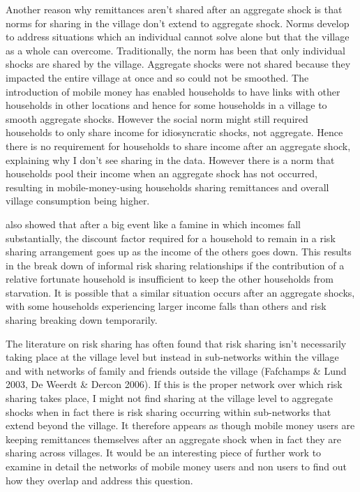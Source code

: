 Another reason why remittances aren't shared after an aggregate shock is that norms for sharing in the village don't extend to aggregate shock. Norms develop to address situations which an individual cannot solve alone but that the village as a whole can overcome. Traditionally, the norm has been that only individual shocks are shared by the village. Aggregate shocks were not shared because they impacted the entire village at once and so could not be smoothed. The introduction of mobile money has enabled households to have links with other households in other locations and hence for some households in a village to smooth aggregate shocks. However the social norm might still required households to only share income for idiosyncratic shocks, not aggregate. Hence there is no requirement for households to share income after an aggregate shock, explaining why I don't see sharing in the data. However there is a norm that households pool their income when an aggregate shock has not occurred, resulting in mobile-money-using households sharing remittances and overall village consumption being higher.

\cite{coate1993} also showed that after a big event like a famine in which incomes fall substantially, the discount factor required for a household to remain in a risk sharing arrangement goes up as the income of the others goes down. This results in the break down of informal risk sharing relationships if the contribution of a relative fortunate household is insufficient to keep the other households from starvation. It is possible that a similar situation occurs after an aggregate shocks, with some households experiencing larger income falls than others and risk sharing breaking down temporarily.  

The literature on risk sharing has often found that risk sharing isn't necessarily taking place at the village level but instead in sub-networks within the village and with networks of family and friends outside the village (Fafchamps \& Lund 2003, De Weerdt \& Dercon 2006). If this is the proper network over which risk sharing takes place, I might not find sharing at the village level to aggregate shocks when in fact there is risk sharing occurring within sub-networks that extend beyond the village. It therefore appears as though mobile money users are keeping remittances themselves after an aggregate shock when in fact they are sharing across villages. It would be an interesting piece of further work to examine in detail the networks of mobile money users and non users to find out how they overlap and address this question. 

